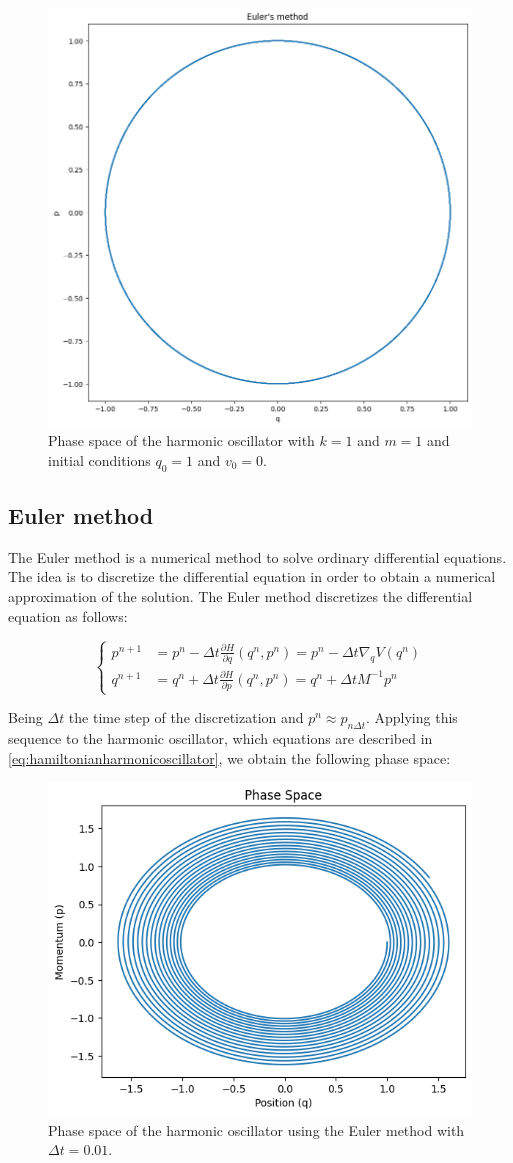 \documentclass{report}
\begin{document}
\begin{figure}[H]
	\centering
	\includegraphics[width=0.5\linewidth]{./Figures/Sympletic/phaseanalytics.png}
	\caption{Phase space of the harmonic oscillator with \(k = 1\) and \(m = 1\) and initial conditions \(q_0 = 1\) and \(v_0 = 0\).}
	\label{fig:harmonicoscillator}
\end{figure}


\subsection{Euler method}
\label{sec:euler_method}

The Euler method is a numerical method to solve ordinary differential equations. The idea is to discretize the differential equation in order to obtain a numerical approximation of the solution. The Euler method discretizes the differential equation as follows:

\begin{equation}
	\begin{cases}
		p^{n+1} &= p^n - \Delta t \frac{\partial H}{\partial q}(q^n, p^n) = p^n - \Delta t \nabla_q V(q^n) \\
		q^{n+1} &= q^n + \Delta t \frac{\partial H}{\partial p}(q^n, p^n) = q^n + \Delta t M^{-1} p^n
	\end{cases}
	\label{eq:euler}
\end{equation}

Being \(\Delta t\) the time step of the discretization and $p^n \approx p_{n\Delta t}$. Applying this sequence to the harmonic oscillator, which equations are described in \eqref{eq:hamiltonianharmonicoscillator}, we obtain the following phase space:

\begin{figure}[H]
	\centering
	\includegraphics[width=0.5\linewidth]{./Figures/Sympletic/eulerphase1.png}
	\caption{Phase space of the harmonic oscillator using the Euler method with \(\Delta t = 0.01\).}
	\label{fig:hamiltonianharmonicoscillator}
\end{figure}
\end{document}

